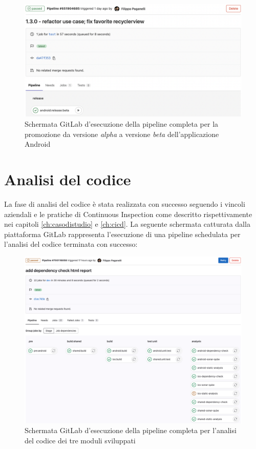 \begin{figure}[H]
\centering
    \includegraphics[width=1\textwidth]{img/gitlab-pipeline-android-beta.png}
    \caption{Schermata GitLab d'esecuzione della pipeline completa per la promozione da versione \textit{alpha} a versione \textit{beta} dell'applicazione Android}
    \label{gitlab-pipeline-android-beta}
\end{figure}

\section{Analisi del codice}
La fase di analisi del codice è stata realizzata con successo seguendo i vincoli aziendali e le pratiche di Continuous Inspection come descritto rispettivamente nei capitoli \ref{ch:casodistudio} e \ref{ch:cicd}. 
La seguente schermata catturata dalla piattaforma GitLab rappresenta l'esecuzione di una pipeline schedulata per l'analisi del codice terminata con successo:

\begin{figure}[H]
\centering
    \includegraphics[width=1\textwidth]{img/gitlab-pipeline-analysis.png}
    \caption{Schermata GitLab d'esecuzione della pipeline completa per l'analisi del codice dei tre moduli sviluppati}
    \label{gitlab-pipeline-analysis}
\end{figure}

